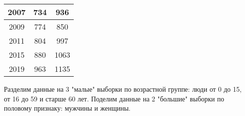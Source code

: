 \documentclass[utf8, a4paper, 14pt, russian, oneside]{book}
\begin{document}
\begin{table}[h!]
\begin{tabular}{|c|c|c|}
        2007 & 734 & 936 \\ \hline
        2009 & 774 & 850 \\ \hline
        2011 & 804 & 997 \\ \hline
        2015 & 880 & 1063 \\ \hline
        2019 & 963 & 1135 \\ \hline
    \end{tabular}
\end{table}

Разделим данные на 3 "малые" выборки по возрастной группе: люди от 0 до 15, от 16 до 59 и старше 60 лет.
Поделим данные на 2 "большие" выборки по половому признаку: мужчины и женщины.
\end{document}
